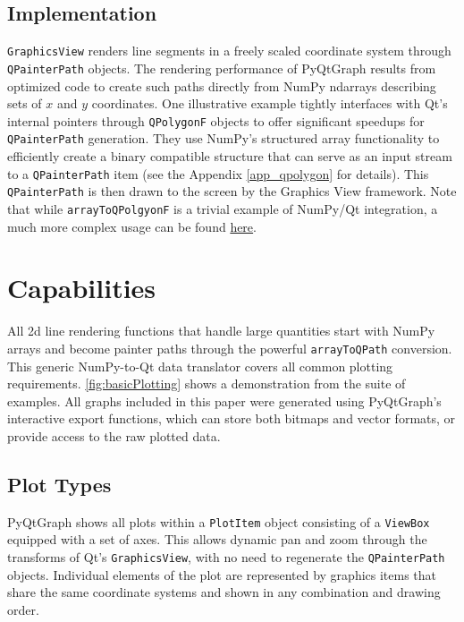 \subsection{Implementation}
\texttt{GraphicsView} renders line segments in a freely scaled coordinate system through \texttt{QPainterPath} objects. The rendering performance of PyQtGraph results from optimized code to create such paths directly from NumPy ndarrays describing sets of $x$ and $y$ coordinates. One illustrative example tightly interfaces with Qt's internal pointers through \texttt{QPolygonF} objects to offer significant speedups for \texttt{QPainterPath} generation. They use NumPy's structured array functionality to efficiently create a binary compatible structure that can serve as an input stream to a \texttt{QPainterPath} item (see the Appendix \autoref{app_qpolygon} for details). This \texttt{QPainterPath} is then drawn to the screen by the Graphics View framework. Note that while \texttt{arrayToQPolgyonF} is a trivial example of NumPy/Qt integration, a much more complex usage can be found \href{https://github.com/pyqtgraph/pyqtgraph/blob/71bcf3f6d078b07a19b90791d96d27d28cb545d1/pyqtgraph/functions.py#L1967}{here}.

\section{Capabilities}
All 2d line rendering functions that handle large quantities start with NumPy arrays and become painter paths through the powerful \texttt{arrayToQPath} conversion. This generic NumPy-to-Qt data translator covers all common plotting requirements. \autoref{fig:basicPlotting} shows a demonstration from the suite of examples. All graphs included in this paper were generated using PyQtGraph's interactive export functions, which can store both bitmaps and vector formats, or provide access to the raw plotted data.

\subsection{Plot Types}

PyQtGraph shows all plots within a \texttt{PlotItem} object consisting of a \texttt{ViewBox} equipped with a set of axes. This allows dynamic pan and zoom through the transforms of Qt's \texttt{GraphicsView}, with no need to regenerate the \texttt{QPainterPath} objects. Individual elements of the plot are represented by graphics items that share the same coordinate systems and shown in any combination and drawing order.

